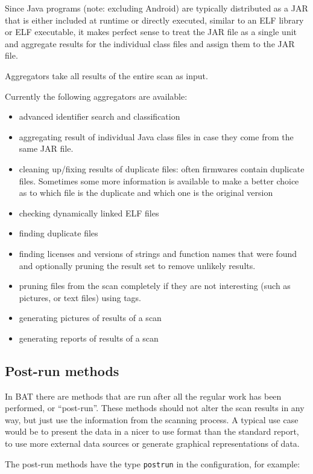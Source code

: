 \documentclass[10pt,a4paper]{article}
\begin{document}
Since Java programs (note: excluding Android) are typically distributed as a
JAR that is either included at runtime or directly executed, similar to an ELF
library or ELF executable, it makes perfect sense to treat the JAR file as a
single unit and aggregate results for the individual class files and assign
them to the JAR file.

Aggregators take all results of the entire scan as input.

Currently the following aggregators are available:

\begin{itemize}
\item advanced identifier search and classification
\item aggregating result of individual Java class files in case they come from
the same JAR file.
\item cleaning up/fixing results of duplicate files: often firmwares contain
duplicate files. Sometimes some more information is available to make a better
choice as to which file is the duplicate and which one is the original version
\item checking dynamically linked ELF files
\item finding duplicate files
\item finding licenses and versions of strings and function names that were
found and optionally pruning the result set to remove unlikely results.
\item pruning files from the scan completely if they are not interesting (such
as pictures, or text files) using tags.
\item generating pictures of results of a scan
\item generating reports of results of a scan
\end{itemize}

\subsection{Post-run methods}

In BAT there are methods that are run after all the regular work has been
performed, or ``post-run''. These methods should not alter the scan results in
any way, but just use the information from the scanning process. A typical use
case would be to present the data in a nicer to use format than the standard
report, to use more external data sources or generate graphical representations
of data.

The post-run methods have the type \texttt{postrun} in the configuration, for
example:
\end{document}

